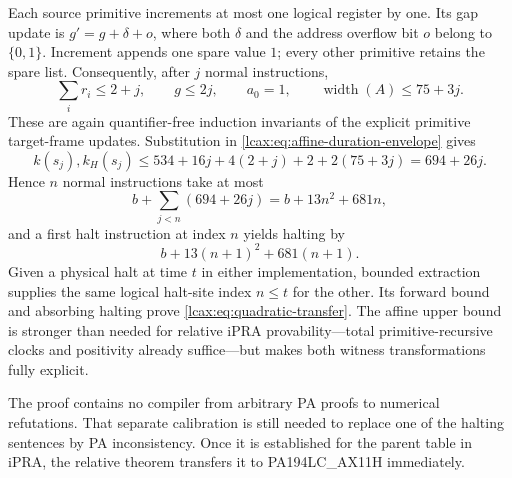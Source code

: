 Each source primitive increments at most one logical register by one.
Its gap update is $g'=g+\delta+o$, where both $\delta$ and the address
overflow bit $o$ belong to $\{0,1\}$.  Increment appends one spare value
$1$; every other primitive retains the spare list.  Consequently,
after $j$ normal instructions,
\[
 \sum_i r_i\le2+j,\qquad g\le2j,\qquad
 a_0=1,\qquad \operatorname{width}(A)\le75+3j.
\]
These are again quantifier-free induction invariants of the explicit
primitive target-frame updates.  Substitution in
\eqref{lcax:eq:affine-duration-envelope} gives
\[
 k(s_j),k_H(s_j)\le
 534+16j+4(2+j)+2+2(75+3j)=694+26j.
\]
Hence $n$ normal instructions take at most
\[
 b+\sum_{j<n}(694+26j)=b+13n^2+681n,
\]
and a first halt instruction at index $n$ yields halting by
\[
 b+13(n+1)^2+681(n+1).
\]
Given a physical halt at time $t$ in either implementation, bounded
extraction supplies the same logical halt-site index $n\le t$ for the
other.  Its forward bound and absorbing halting prove
\eqref{lcax:eq:quadratic-transfer}.  The affine upper bound is stronger than
needed for relative iPRA provability---total primitive-recursive clocks
and positivity already suffice---but makes both witness transformations
fully explicit.

The proof contains no compiler from arbitrary PA proofs to numerical
refutations.  That separate calibration is still needed to replace one
of the halting sentences by PA inconsistency.  Once it is established
for the parent table in iPRA, the relative theorem transfers it to
PA194LC\_AX11H immediately.
